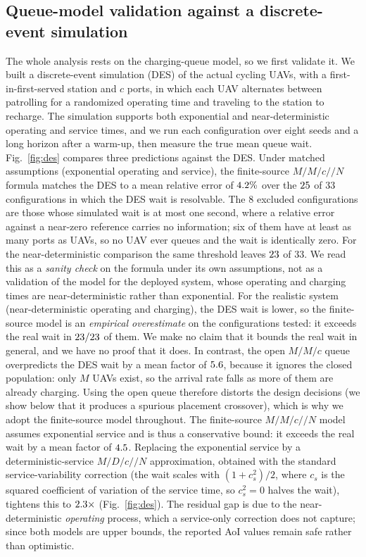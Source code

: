 \subsection{Queue-model validation against a discrete-event simulation}
\label{sec:des}
The whole analysis rests on the charging-queue model, so we first validate it.
We built a discrete-event simulation (DES) of the actual cycling UAVs, with a
first-in-first-served station and $c$ ports, in which each UAV alternates between
patrolling for a randomized operating time and traveling to the station to
recharge. The simulation supports both exponential and near-deterministic
operating and service times, and we run each configuration over eight seeds and
a long horizon after a warm-up, then measure the true mean queue wait.
Fig.~\ref{fig:des} compares three predictions against the DES. Under
matched assumptions (exponential operating and service), the finite-source
$M/M/c//N$ formula matches the DES to a mean relative error of $4.2\%$
over the $25$ of $33$ configurations in which the DES wait is resolvable. The $8$ excluded configurations are those whose simulated wait is at most one second, where a relative error against a near-zero reference carries no information; six of them have at least as many ports as UAVs, so no UAV ever queues and the wait is identically zero. For the near-deterministic comparison the same threshold leaves $23$ of $33$. We read
this as a \emph{sanity check} on the formula under its own assumptions, not as a
validation of the model for the deployed system, whose operating and charging times
are near-deterministic rather than exponential. For the realistic system (near-deterministic operating and
charging), the DES wait is lower, so the finite-source model is an
\emph{empirical overestimate} on the configurations tested: it exceeds the real wait in
$23/23$ of them. We make no claim that it bounds the real wait in
general, and we have no proof that it does. In contrast, the open $M/M/c$ queue overpredicts the DES wait
by a mean factor of $5.6$, because it ignores the closed
population: only $M$ UAVs
exist, so the arrival rate falls as more of them are already charging. Using the
open queue therefore distorts the design decisions (we show below that it
produces a spurious placement crossover), which is why we adopt the
finite-source model throughout. The finite-source $M/M/c//N$ model assumes
exponential service and is thus a conservative bound: it exceeds the real wait by
a mean factor of $4.5$. Replacing the exponential service by a deterministic-service
$M/D/c//N$ approximation, obtained with the standard service-variability
correction (the wait scales with $(1+c_s^2)/2$, where $c_s$ is the squared
coefficient of variation of the service time, so $c_s^2{=}0$ halves the wait),
tightens this to $2.3\times$ (Fig.~\ref{fig:des}). The residual gap is due
to the near-deterministic \emph{operating} process, which a service-only
correction does not capture; since both models are upper bounds, the reported
AoI values remain safe rather than optimistic.

